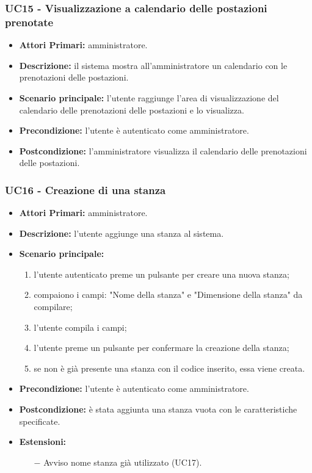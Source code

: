 \subsubsection{ UC15 - Visualizzazione a calendario delle postazioni prenotate}
\begin{itemize}
	\item\textbf{Attori Primari:}
	amministratore.
	\item\textbf{Descrizione:}
	il sistema mostra all'amministratore un calendario con le prenotazioni delle postazioni.
	\item\textbf{Scenario principale:}
	l'utente raggiunge l'area di visualizzazione del calendario delle prenotazioni delle postazioni e lo visualizza.
	\item\textbf{Precondizione:} 
	l'utente è autenticato come amministratore.
	\item\textbf{Postcondizione:}
	l'amministratore visualizza il calendario delle prenotazioni delle postazioni.
\end{itemize}

\subsubsection{ UC16 - Creazione di una stanza}
\begin{itemize}
	\item\textbf{Attori Primari:}
	amministratore.
	\item\textbf{Descrizione:} 
	l'utente aggiunge una stanza al sistema.
	\item\textbf{Scenario principale:} 
	\begin{enumerate}
		\item l'utente autenticato preme un pulsante per creare una nuova stanza;
		\item compaiono i campi: "Nome della stanza" e "Dimensione della stanza" da compilare;
		\item l'utente compila i campi;
		\item l'utente preme un pulsante per confermare la creazione della stanza;
		\item se non è già presente una stanza con il codice inserito, essa viene creata.
	\end{enumerate}
	\item\textbf{Precondizione:} 
	l'utente è autenticato come amministratore.
	\item\textbf{Postcondizione:}
	è stata aggiunta una stanza vuota con le caratteristiche specificate.
	\item\textbf{Estensioni:}
	\begin{itemize}
		\item[$-$] Avviso nome stanza già utilizzato (UC17).
	\end{itemize}
\end{itemize}

